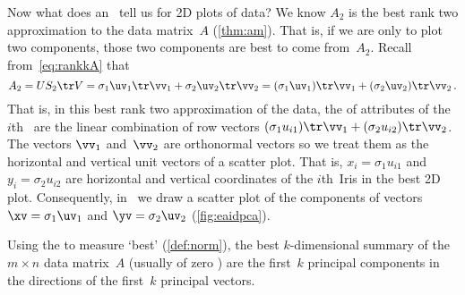 Now what does an \svd\ tell us for 2D plots of data?  
We know \(A_2\) is the best rank two approximation to the data matrix~\(A\) (\autoref{thm:am}). 
That is, if we are only to plot two components, those two components are best to come from~\(A_2\).
Recall from~\eqref{eq:rankkA} that
\begin{equation*}
A_2=US_2\tr V =\sigma_1\uv_1\tr\vv_1 +\sigma_2\uv_2\tr\vv_2
=(\sigma_1\uv_1)\tr\vv_1 +(\sigma_2\uv_2)\tr\vv_2\,.
\end{equation*}
That is, in this best rank two approximation of the data, the  of attributes of the \(i\)th~ are the linear combination of row vectors \((\sigma_1u_{i1})\tr\vv_1+(\sigma_2u_{i2})\tr\vv_2\).
The vectors \(\vv_1\) and~\(\vv_2\) are orthonormal vectors so we treat them as the horizontal and vertical unit vectors of a scatter plot. 
That is, \(x_i=\sigma_1u_{i1}\) and \(y_i=\sigma_2u_{i2}\) are horizontal and vertical coordinates of the \(i\)th~Iris in the best 2D plot.
Consequently, in \script\ we draw a scatter plot of the components of vectors \(\xv=\sigma_1\uv_1\) and \(\yv=\sigma_2\uv_2\) (\autoref{fig:eaidpca}).


\begin{theorem} \label{thm:pc}
Using the  to measure `best' (\autoref{def:norm}), the best \(k\)-dimensional summary of the \(m\times n\) data matrix~\(A\)  (usually of zero ) are the first~\(k\) principal components in the directions of the first~\(k\) principal vectors.
\end{theorem}

